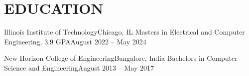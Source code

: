 \section{EDUCATION}\vspace*{-4pt}

    \resumeSubHeadingListStart

        \resumeSubheading
        {Illinois Institute of Technology}{Chicago, IL}
        {Masters in Electrical and Computer Engineering}{, 3.9 GPA}{August 2022 -- May 2024}
        \resumeItemListStart
        \resumeItemListEnd

        \resumeSubheading
        {New Horizon College of Engineering}{Bangalore, India}
        {Bachelors in Computer Science and Engineering}{}{August 2013 -- May 2017}
        \resumeItemListStart
        \resumeItemListEnd

    \resumeSubHeadingListEnd